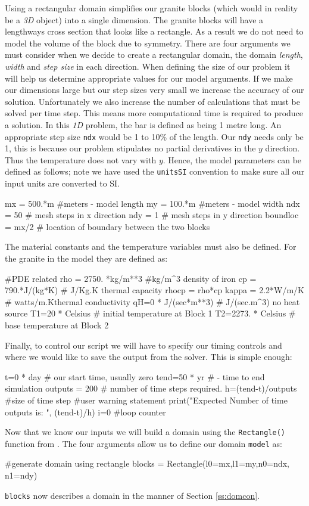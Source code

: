 Using a rectangular domain simplifies our granite blocks (which would in reality
be a \textit{3D} object) into a single dimension. The granite blocks will have a
lengthways cross section that looks like a rectangle.  As a result we do not
need to model the volume of the block due to symmetry. There are four arguments
we must consider when we decide to create a rectangular domain, the domain
\textit{length}, \textit{width} and \textit{step size} in each direction. When
defining the size of our problem it will help us determine appropriate values
for our model arguments. If we make our dimensions large but our step sizes very
small we increase the accuracy of our solution. Unfortunately we also increase
the number of calculations that must be solved per time step. This means more
computational time is required to produce a solution. In this \textit{1D}
problem, the bar is defined as being 1 metre long. An appropriate step size
\verb|ndx| would be 1 to 10\% of the length. Our \verb|ndy| needs only be 1,
this is because our problem stipulates no partial derivatives in the $y$
direction.
Thus the temperature does not vary with $y$. Hence, the model parameters can be
defined as follows; note we have used the \verb|unitsSI| convention to make sure
all our input units are converted to SI.
\begin{python}
mx = 500.*m #meters - model length
my = 100.*m #meters - model width
ndx = 50 # mesh steps in x direction 
ndy = 1 # mesh steps in y direction
boundloc = mx/2 # location of boundary between the two blocks
\end{python}
The material constants and the temperature variables must also be defined. For
the granite in the model they are defined as:
\begin{python}
#PDE related
rho = 2750. *kg/m**3 #kg/m^{3} density of iron
cp = 790.*J/(kg*K) # J/Kg.K thermal capacity
rhocp = rho*cp 
kappa = 2.2*W/m/K   # watts/m.Kthermal conductivity
qH=0 * J/(sec*m**3) # J/(sec.m^{3}) no heat source
T1=20 * Celsius # initial temperature at Block 1
T2=2273. * Celsius # base temperature at Block 2
\end{python}
Finally, to control our script we will have to specify our timing controls and
where we would like to save the output from the solver. This is simple enough:
\begin{python}
t=0 * day  # our start time, usually zero
tend=50 * yr # - time to end simulation
outputs = 200 # number of time steps required.
h=(tend-t)/outputs #size of time step
#user warning statement
print("Expected Number of time outputs is: ", (tend-t)/h)
i=0 #loop counter
\end{python}
Now that we know our inputs we will build a domain using the
\verb|Rectangle()| function from \FINLEY. The four arguments allow us to
define our domain \verb|model| as:
\begin{python}
#generate domain using rectangle
blocks = Rectangle(l0=mx,l1=my,n0=ndx, n1=ndy)
\end{python}
\verb|blocks| now describes a domain in the manner of Section \ref{ss:domcon}.

